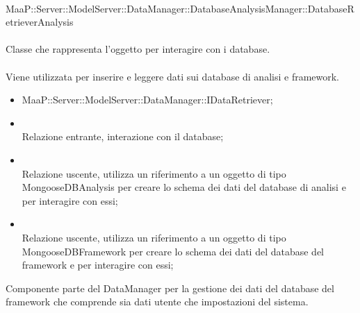 \\
MaaP::Server::ModelServer::DataManager::DatabaseAnalysisManager::DatabaseRetrieverAnalysis\\
\\
Classe che rappresenta l'oggetto per interagire con i database.\\
\\
Viene utilizzata per inserire e leggere dati sui database di analisi e framework.\\
\begin{itemize}
\item MaaP::Server::ModelServer::DataManager::IDataRetriever;
\end{itemize}
\begin{itemize}
\item{}\\
Relazione entrante, interazione con il database;
\item{}\\
Relazione uscente, utilizza un riferimento a un oggetto di tipo MongooseDBAnalysis per creare lo schema dei dati del database di analisi e per interagire con essi;
\item{}\\
Relazione uscente, utilizza un riferimento a un oggetto di tipo MongooseDBFramework per creare lo schema dei dati del database del framework e per interagire con essi;
\end{itemize}


Componente parte del DataManager per la gestione dei dati del database del framework che comprende sia dati utente che impostazioni del sistema.

